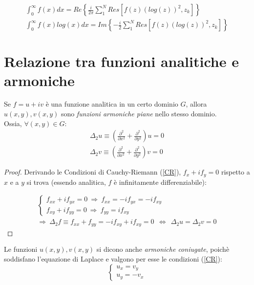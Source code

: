 \documentclass[twoside]{article}
\begin{document}
\begin{equation}
\begin{split}
    \int_0^\infty f(x)dx=Re\left\{\frac{i}{2\pi}\sum_1^NRes[f(z)(log(z))^2,z_k]\right\} \\ \int_0^\infty f(x)log(x)dx=Im\left\{-\frac{i}{2}\sum_1^NRes[f(z)(log(z))^2,z_k]\right\}
\end{split}\end{equation}
\newpage

\section{Relazione tra funzioni analitiche e armoniche}
Se $f=u+iv$ è una funzione analitica in un certo dominio $G$, allora $u(x,y), v(x,y)$ sono \textit{funzioni armoniche piane} nello stesso dominio.
\\
Ossia, $\forall (x,y) \in G$:
\begin{equation}
    \begin{split}
        \Delta_2 u\equiv \left( \frac{\partial^2}{\partial x^2}+\frac{\partial^2}{\partial y^2} \right) u=0 \\
        \Delta_2 v\equiv \left( \frac{\partial^2}{\partial x^2}+\frac{\partial^2}{\partial y^2} \right) v =0
    \end{split}
\end{equation}

\begin{proof}
Derivando le Condizioni di Cauchy-Riemann (\ref{CR}), $f_x+if_y=0$ rispetto a $x$ e a $y$ si trova (essendo analitica, $f$ è infinitamente differenziabile):

\begin{equation}
\begin{split}
     \left \{ \begin{array}{lr}
         f_{xx}+if_{yx}=0 \ \Rightarrow \ f_{xx}=-if_{yx}=-if_{xy}  \\
         f_{xy}+if_{yy}=0 \ \Rightarrow \ f_{yy}=if_{xy} 
    \end{array}
    \right. \\
    \Rightarrow \ \Delta_2 f \equiv f_{xx}+f_{yy}=-if_{xy}+if_{xy}=0 \ \ \iff \ \ \Delta_2 u = \Delta_2 v =0
\end{split}
\end{equation}

\end{proof}

Le funzioni $u(x,y), v(x,y)$ si dicono anche \textit{armoniche coniugate}, poichè soddisfano l'equazione di Laplace e valgono per esse le condizioni (\ref{CR}):
\begin{equation}
    \left \{ \begin{array}{lr}
         u_x=v_y \\
         u_y=-v_x
    \end{array}
    \right.
\end{equation}
\end{document}
